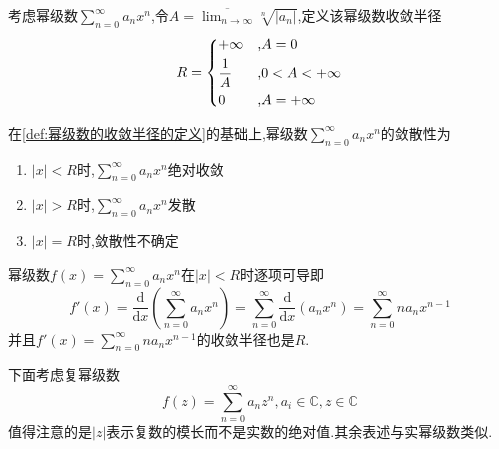 \begin{formal}
    \begin{definition}[幂级数的收敛半径的定义]\label{def:幂级数的收敛半径的定义}
        考虑幂级数$\displaystyle \sum_{n=0}^{\infty}a_nx^n$,令$\displaystyle A=\overline{\lim_{n\to\infty}}\sqrt[n]{\left|a_n\right|}$,定义该幂级数收敛半径\[
        R=\begin{cases*}
            +\infty&,$A=0$\\
            \dfrac{1}{A}&,$0<A<+\infty$\\
            0&,$A=+\infty$
        \end{cases*}
        \]
    \end{definition}
\end{formal}
\begin{formal}
    \begin{theorem}\label{thm:Cauchy-Hadamard定理}
        在\cref{def:幂级数的收敛半径的定义}的基础上,幂级数$\displaystyle \sum_{n=0}^{\infty}a_nx^n$的敛散性为\begin{enumerate}[label={\textup{(\arabic*)}}]
            \item $\left|x\right|<R$时,$\displaystyle \sum_{n=0}^{\infty}a_nx^n$绝对收敛
            \item $\left|x\right|>R$时,$\displaystyle \sum_{n=0}^{\infty}a_nx^n$发散
            \item $\left|x\right|=R$时,敛散性不确定
        \end{enumerate}
    \end{theorem}
\end{formal}
\begin{formal}
    \begin{theorem}[逐项可导性]\label{thm:逐项可导性}
        幂级数$\displaystyle f\left(x\right)=\sum_{n=0}^{\infty}a_nx^n$在$\left|x\right|<R$时逐项可导即\[
        f'\left(x\right)=\frac{\mathrm{d}}{\mathrm{d}x}\left(
            \sum_{n=0}^{\infty}a_nx^n
        \right)=\sum_{n=0}^{\infty}\frac{
            \mathrm{d}
        }{\mathrm{d}x}\left(
            a_nx^n
        \right)=\sum_{n=0}^{\infty}na_nx^{n-1}
        \]并且$\displaystyle f'\left(x\right)=
        \sum_{n=0}^{\infty}na_nx^{n-1}
         $的收敛半径也是$R$.
    \end{theorem}
\end{formal}
\begin{red}
\begin{remark}
    下面考虑复幂级数
    \[
    f\left(z\right)=\sum_{n=0}^{\infty}a_nz^n
    ,a_i\in\mathbb{C},z\in\mathbb{C}
    \]值得注意的是$\left|z\right|$表示复数的模长而不是实数的绝对值.其余表述与实幂级数类似.
\end{remark}
\end{red}
